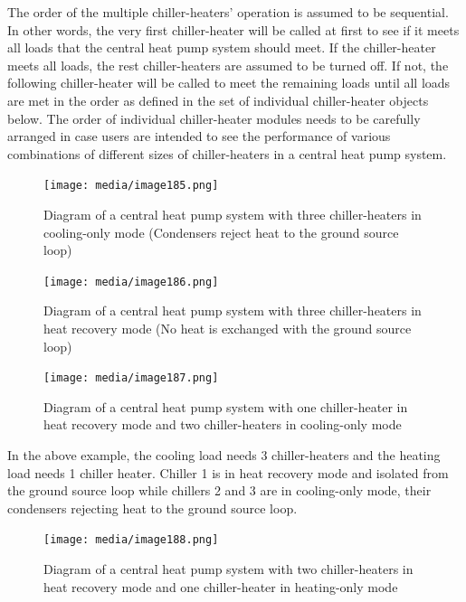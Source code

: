 The order of the multiple chiller-heaters' operation is assumed to be sequential. In other words, the very first chiller-heater will be called at first to see if it meets all loads that the central heat pump system should meet. If the chiller-heater meets all loads, the rest chiller-heaters are assumed to be turned off. If not, the following chiller-heater will be called to meet the remaining loads until all loads are met in the order as defined in the set of individual chiller-heater objects below. The order of individual chiller-heater modules needs to be carefully arranged in case users are intended to see the performance of various combinations of different sizes of chiller-heaters in a central heat pump system.

\begin{figure}[hbtp] %
    \centering
    \texttt{[image: media/image185.png]}
    \caption{Diagram of a central heat pump system with three chiller-heaters in cooling-only mode (Condensers reject heat to the ground source loop) \protect \label{fig:diagram-of-a-central-heat-pump-system-with}}
\end{figure}

\begin{figure}[hbtp] %
    \centering
    \texttt{[image: media/image186.png]}
    \caption{Diagram of a central heat pump system with three chiller-heaters in heat recovery mode         (No heat is exchanged with the ground source loop) \protect \label{fig:diagram-of-a-central-heat-pump-system-with-001}}
\end{figure}

\begin{figure}[hbtp] %
    \centering
    \texttt{[image: media/image187.png]}
    \caption{Diagram of a central heat pump system with one chiller-heater in heat recovery mode and two chiller-heaters in cooling-only mode \protect \label{fig:diagram-of-a-central-heat-pump-system-with-002}}
\end{figure}

In the above example, the cooling load needs 3 chiller-heaters and the heating load needs 1 chiller heater. Chiller 1 is in heat recovery mode and isolated from the ground source loop while chillers 2 and 3 are in cooling-only mode, their condensers rejecting heat to the ground source loop.

\begin{figure}[hbtp] %
    \centering
    \texttt{[image: media/image188.png]}
    \caption{Diagram of a central heat pump system with two chiller-heaters in heat recovery mode and one chiller-heater in heating-only mode \protect \label{fig:diagram-of-a-central-heat-pump-system-with-003}}
\end{figure}


